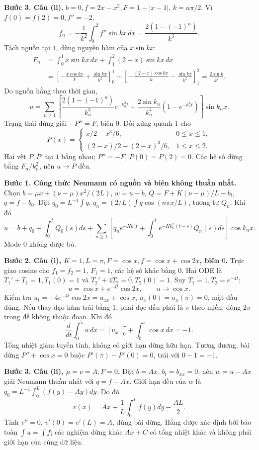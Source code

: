 \textbf{Bước 3. Câu (ii).} $b=0,f=2x-x^2,F=1-|x-1|$, $k=n\pi/2$. Vì $f(0)=f(2)=0,f''=-2$,
\[f_n=-\frac1{k^2}\int_0^2f''\sin kx\,dx=\frac{2(1-(-1)^n)}{k^3}.\]
Tách nguồn tại $1$, dùng nguyên hàm của $x\sin kx$:
\begin{align*}
F_n&=\int_0^1x\sin kx\,dx+\int_1^2(2-x)\sin kx\,dx\\
&=\left[-\frac{x\cos kx}k+\frac{\sin kx}{k^2}\right]_0^1
+\left[-\frac{(2-x)\cos kx}k-\frac{\sin kx}{k^2}\right]_1^2
=\frac{2\sin k}{k^2}.
\end{align*}
Do nguồn hằng theo thời gian,
\[u=\sum_{n\ge1}\left[\frac{2(1-(-1)^n)}{k_n^3}e^{-k_n^2t}
+\frac{2\sin k_n}{k_n^4}(1-e^{-k_n^2t})\right]\sin k_nx.\]
Trạng thái dừng giải $-P''=F$, biên $0$. Đối xứng quanh $1$ cho
\[P(x)=\begin{cases}x/2-x^3/6,&0\le x\le1,\\(2-x)/2-(2-x)^3/6,&1\le x\le2.\end{cases}\]
Hai vết $P,P'$ tại $1$ bằng nhau; $P''=-F$, $P(0)=P(2)=0$. Các hệ số dừng bằng $F_n/k_n^2$, nên $u\to P$ đều.

\textbf{Bước 1. Công thức Neumann có nguồn và biên không thuần nhất.}
Chọn $b=\mu x+(\nu-\mu)x^2/(2L)$, $w=u-b$, $Q=F+K(\nu-\mu)/L-b_t$, $q=f-b_0$. Đặt $q_0=L^{-1}\int q$, $q_n=(2/L)\int q\cos(n\pi x/L)$, tương tự $Q_n$. Khi đó
\[u=b+q_0+\int_0^tQ_0(s)ds+
\sum_{n\ge1}\left[q_ne^{-Kk_n^2t}+
\int_0^te^{-Kk_n^2(t-s)}Q_n(s)ds\right]\cos k_nx.\]
Mode $0$ không được bỏ.

\textbf{Bước 2. Câu (i), $K=1,L=\pi,F=\cos x,f=\cos x+\cos2x$, biên $0$.}
Trực giao cosine cho $f_1=f_2=1$, $F_1=1$, các hệ số khác bằng $0$. Hai ODE là $T_1'+T_1=1,T_1(0)=1$ và $T_2'+4T_2=0,T_2(0)=1$. Suy $T_1=1,T_2=e^{-4t}$:
\[u=\cos x+e^{-4t}\cos2x,\qquad u\to\cos x.\]
Kiểm tra $u_t=-4e^{-4t}\cos2x=u_{xx}+\cos x$, $u_x(0)=u_x(\pi)=0$, mặt đầu đúng.
Nếu thay đạo hàm trái bằng $1$, phải đọc đầu phải là $\pi$ theo miền; dòng $2\pi$ trong đề không thuộc đoạn. Khi đó
\[\frac d{dt}\int_0^\pi u\,dx=[u_x]_0^\pi+\int_0^\pi\cos x\,dx=-1.\]
Tổng nhiệt giảm tuyến tính, không có giới hạn dừng hữu hạn. Tương đương, bài dừng $P''+\cos x=0$ buộc $P'(\pi)-P'(0)=0$, trái với $0-1=-1$.

\textbf{Bước 3. Câu (ii), $\mu=\nu=A,F=0$.}
Đặt $b=Ax$. $b_t=b_{xx}=0$, nên $w=u-Ax$ giải Neumann thuần nhất với $q=f-Ax$. Giới hạn đều của $w$ là $q_0=L^{-1}\int_0^L(f(y)-Ay)dy$. Do đó
\[v(x)=Ax+\frac1L\int_0^Lf(y)dy-\frac{AL}2.\]
Tính $v''=0$, $v'(0)=v'(L)=A$, đúng bài dừng. Hằng được xác định bởi bảo toàn $\int u=\int f$; các nghiệm dừng khác $Ax+C$ có tổng nhiệt khác và không phải giới hạn của cùng dữ liệu.

